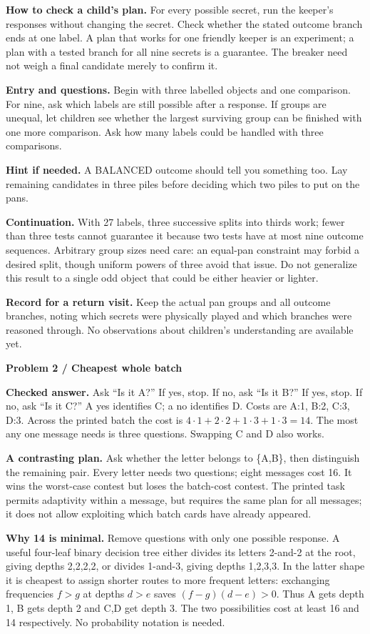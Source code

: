 \documentclass[11pt]{article}
\newcommand{\parttitle}[1]{{\large\bfseries\color{ink}#1}\par}
\newcommand{\labelled}[2]{\textbf{#1} #2\par}
\begin{document}
\labelled{How to check a child's plan.}{For every possible secret, run the keeper's responses without changing the secret. Check whether the stated outcome branch ends at one label. A plan that works for one friendly keeper is an experiment; a plan with a tested branch for all nine secrets is a guarantee. The breaker need not weigh a final candidate merely to confirm it.}
\labelled{Entry and questions.}{Begin with three labelled objects and one comparison. For nine, ask which labels are still possible after a response. If groups are unequal, let children see whether the largest surviving group can be finished with one more comparison. Ask how many labels could be handled with three comparisons.}
\labelled{Hint if needed.}{A BALANCED outcome should tell you something too. Lay remaining candidates in three piles before deciding which two piles to put on the pans.}
\labelled{Continuation.}{With 27 labels, three successive splits into thirds work; fewer than three tests cannot guarantee it because two tests have at most nine outcome sequences. Arbitrary group sizes need care: an equal-pan constraint may forbid a desired split, though uniform powers of three avoid that issue. Do not generalize this result to a single odd object that could be either heavier or lighter.}
\labelled{Record for a return visit.}{Keep the actual pan groups and all outcome branches, noting which secrets were physically played and which branches were reasoned through. No observations about children's understanding are available yet.}
\newpage
\parttitle{Problem 2 / Cheapest whole batch}
\labelled{Checked answer.}{Ask ``Is it A?'' If yes, stop. If no, ask ``Is it B?'' If yes, stop. If no, ask ``Is it C?'' A yes identifies C; a no identifies D. Costs are A:1, B:2, C:3, D:3. Across the printed batch the cost is $4\cdot1+2\cdot2+1\cdot3+1\cdot3=14$. The most any one message needs is three questions. Swapping C and D also works.}
\labelled{A contrasting plan.}{Ask whether the letter belongs to \{A,B\}, then distinguish the remaining pair. Every letter needs two questions; eight messages cost 16. It wins the worst-case contest but loses the batch-cost contest. The printed task permits adaptivity within a message, but requires the same plan for all messages; it does not allow exploiting which batch cards have already appeared.}
\labelled{Why 14 is minimal.}{Remove questions with only one possible response. A useful four-leaf binary decision tree either divides its letters 2-and-2 at the root, giving depths 2,2,2,2, or divides 1-and-3, giving depths 1,2,3,3. In the latter shape it is cheapest to assign shorter routes to more frequent letters: exchanging frequencies $f>g$ at depths $d>e$ saves $(f-g)(d-e)>0$. Thus A gets depth 1, B gets depth 2 and C,D get depth 3. The two possibilities cost at least 16 and 14 respectively. No probability notation is needed.}
\end{document}
